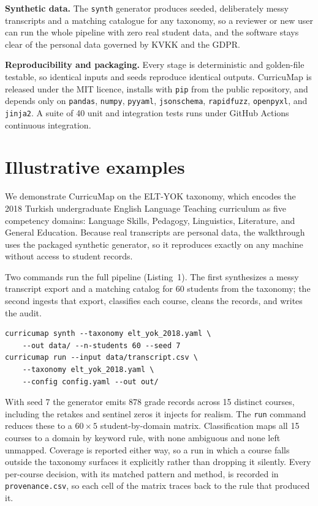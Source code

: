 \documentclass[11pt]{article}
\begin{document}
\textbf{Synthetic data.} The \texttt{synth} generator produces seeded, deliberately messy transcripts and a matching catalogue for any taxonomy, so a reviewer or new user can run the whole pipeline with zero real student data, and the software stays clear of the personal data governed by KVKK \cite{kvkk} and the GDPR.

\textbf{Reproducibility and packaging.} Every stage is deterministic and golden-file testable, so identical inputs and seeds reproduce identical outputs. CurricuMap is released under the MIT licence, installs with \texttt{pip} from the public repository, and depends only on \texttt{pandas}, \texttt{numpy}, \texttt{pyyaml}, \texttt{jsonschema}, \texttt{rapidfuzz}, \texttt{openpyxl}, and \texttt{jinja2}. A suite of 40 unit and integration tests runs under GitHub Actions continuous integration.

\section{Illustrative examples}
\label{sec:examples}

We demonstrate CurricuMap on the ELT-YOK taxonomy, which encodes the 2018 Turkish undergraduate English Language Teaching curriculum \cite{yok2018} as five competency domains: Language Skills, Pedagogy, Linguistics, Literature, and General Education. Because real transcripts are personal data, the walkthrough uses the packaged synthetic generator, so it reproduces exactly on any machine without access to student records.

Two commands run the full pipeline (Listing~1). The first synthesizes a messy transcript export and a matching catalog for 60 students from the taxonomy; the second ingests that export, classifies each course, cleans the records, and writes the audit.

\begin{verbatim}
curricumap synth --taxonomy elt_yok_2018.yaml \
    --out data/ --n-students 60 --seed 7
curricumap run --input data/transcript.csv \
    --taxonomy elt_yok_2018.yaml \
    --config config.yaml --out out/
\end{verbatim}

With seed 7 the generator emits 878 grade records across 15 distinct courses, including the retakes and sentinel zeros it injects for realism. The \texttt{run} command reduces these to a $60\times5$ student-by-domain matrix. Classification maps all 15 courses to a domain by keyword rule, with none ambiguous and none left unmapped. Coverage is reported either way, so a run in which a course falls outside the taxonomy surfaces it explicitly rather than dropping it silently. Every per-course decision, with its matched pattern and method, is recorded in \texttt{provenance.csv}, so each cell of the matrix traces back to the rule that produced it.
\end{document}
